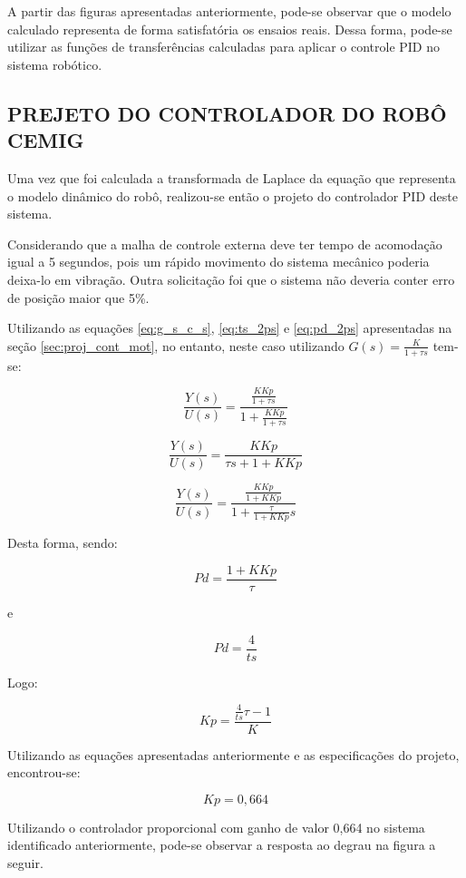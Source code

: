 \documentclass[12pt,oneside,a4paper, chapter=TITLE, section = TITLE, english, brazil]{abntex2}
\begin{document}
A partir das figuras apresentadas anteriormente, pode-se observar que o modelo calculado representa de forma satisfatória os ensaios reais. Dessa forma, pode-se utilizar as funções de transferências calculadas para aplicar o controle PID no sistema robótico.

\subsection{PREJETO DO CONTROLADOR DO ROBÔ CEMIG} %

Uma vez que foi calculada a transformada de Laplace da equação que representa o modelo dinâmico do robô, realizou-se então o projeto do controlador PID deste sistema.

Considerando que a malha de controle externa deve ter tempo de acomodação igual a 5 segundos, pois um rápido movimento do sistema mecânico poderia deixa-lo em vibração. Outra solicitação foi que o sistema não deveria conter erro de posição maior que 5\%.

Utilizando as equações \ref{eq:g_s_c_s}, \ref{eq:ts_2ps} e \ref{eq:pd_2ps} apresentadas na seção \ref{sec:proj_cont_mot}, no entanto, neste caso utilizando $G(s) = \frac{K}{1 + \tau s}$ tem-se:

$$ \frac{Y(s)}{U(s)} = \frac{\frac{K Kp}{1 + \tau s}}{1 + \frac{K Kp}{1 + \tau s}} $$

$$ \frac{Y(s)}{U(s)} = \frac{K Kp}{\tau s + 1 + K Kp} $$

\begin{equation}
\frac{Y(s)}{U(s)} = \frac{\frac{K Kp}{1 + K Kp}}{ 1 + \frac{\tau}{1 + K Kp}s}
\end{equation}

Desta forma, sendo:

$$Pd = \frac{1 + K Kp}{\tau}$$

e

$$Pd = \frac{4}{ts}$$

Logo:

\begin{equation}
Kp = \frac{\frac{4}{ts}\tau - 1}{K}
\end{equation}

Utilizando as equações apresentadas anteriormente e as especificações do projeto, encontrou-se:

$$ Kp = 0,664 $$

Utilizando o controlador proporcional com ganho de valor 0,664 no sistema identificado anteriormente, pode-se observar a resposta ao degrau na figura a seguir.
\end{document}
